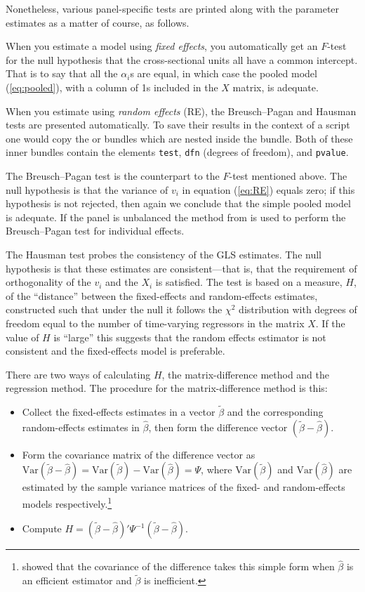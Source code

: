 Nonetheless, various panel-specific tests are printed along with the
parameter estimates as a matter of course, as follows.

When you estimate a model using \textsl{fixed effects}, you
automatically get an $F$-test for the null hypothesis that the
cross-sectional units all have a common intercept.  That is to say
that all the $\alpha_i$s are equal, in which case the pooled model
(\ref{eq:pooled}), with a column of 1s included in the $X$ matrix, is
adequate.

When you estimate using \textsl{random effects} (RE), the
Breusch--Pagan and Hausman tests are presented automatically. To save
their results in the context of a script one would copy the
 or  bundles which
are nested inside the  bundle. Both of these inner
bundles contain the elements \texttt{test}, \texttt{dfn} (degrees of
freedom), and \texttt{pvalue}.

The Breusch--Pagan test is the counterpart to the $F$-test mentioned
above.  The null hypothesis is that the variance of $v_i$ in
equation (\ref{eq:RE}) equals zero; if this hypothesis is not 
rejected, then again we conclude that the simple pooled model is 
adequate. If the panel is unbalanced the method from 
\cite{baltagi-li90} is used to perform the Breusch--Pagan test for 
individual effects.

The Hausman test probes the consistency of the GLS estimates.  The
null hypothesis is that these estimates are consistent---that is,
that the requirement of orthogonality of the $v_i$ and the $X_i$ is
satisfied.  The test is based on a measure, $H$, of the ``distance''
between the fixed-effects and random-effects estimates, constructed
such that under the null it follows the $\chi^2$ distribution with
degrees of freedom equal to the number of time-varying regressors in
the matrix $X$.  If the value of $H$ is ``large'' this suggests that
the random effects estimator is not consistent and the fixed-effects
model is preferable.

There are two ways of calculating $H$, the matrix-difference method
and the regression method.  The procedure for the matrix-difference
method is this:
\begin{itemize}
\item Collect the fixed-effects estimates in a vector
  $\tilde{\beta}$ and the corresponding random-effects estimates in
  $\hat{\beta}$, then form the difference vector $(\tilde{\beta} -
  \hat{\beta})$. 
\item Form the covariance matrix of the difference vector as
  $\mbox{Var}(\tilde{\beta} - \hat{\beta}) = \mbox{Var}(\tilde{\beta})
  - \mbox{Var}(\hat{\beta}) = \Psi$, where $\mbox{Var}(\tilde{\beta})$
  and $\mbox{Var}(\hat{\beta})$ are estimated by the sample variance
  matrices of the fixed- and random-effects models
  respectively.\footnote{\cite{hausman78} showed that the covariance of
    the difference takes this simple form when $\hat{\beta}$ is an
    efficient estimator and $\tilde{\beta}$ is inefficient.}
\item Compute $H = \left(\tilde{\beta} - \hat{\beta}\right)' \Psi^{-1}
   \left(\tilde{\beta} - \hat{\beta}\right)$.
\end{itemize}

